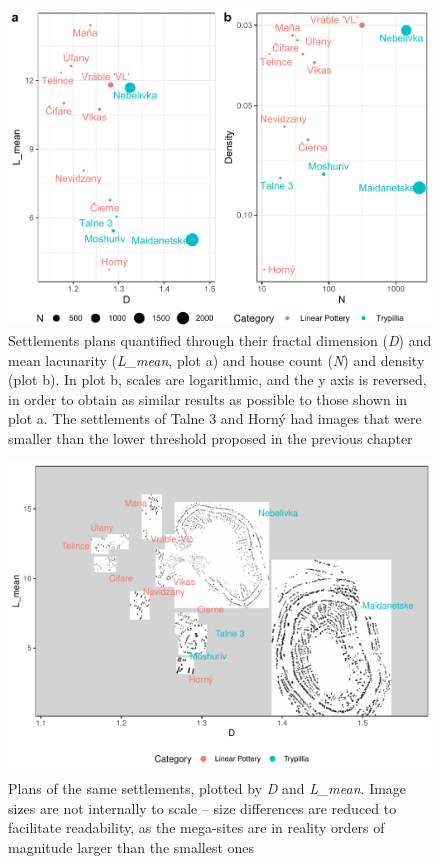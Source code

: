 \documentclass[
  12pt,
]{book}
\begin{document}
\begin{figure}

{\centering \includegraphics[width=0.9\linewidth]{bookdown-demo_files/figure-latex/09-settle-points-1} 

}

\caption{Settlements plans quantified through their fractal dimension (\emph{D}) and mean lacunarity (\emph{L\_mean}, plot a) and house count (\emph{N}) and density (plot b). In plot b, scales are logarithmic, and the y axis is reversed, in order to obtain as similar results as possible to those shown in plot a. The settlements of Talne 3 and Horný had images that were smaller than the lower threshold proposed in the previous chapter}\label{fig:09-settle-points}
\end{figure}

\begin{figure}
\hypertarget{fig:09-settlements}{%
\centering
\includegraphics{Results/fig09_settlements.pdf}
\caption{Plans of the same settlements, plotted by \emph{D} and \emph{L\_mean}. Image sizes are not internally to scale -- size differences are reduced to facilitate readability, as the mega-sites are in reality orders of magnitude larger than the smallest ones}\label{fig:09-settlements}
}
\end{figure}
\end{document}
